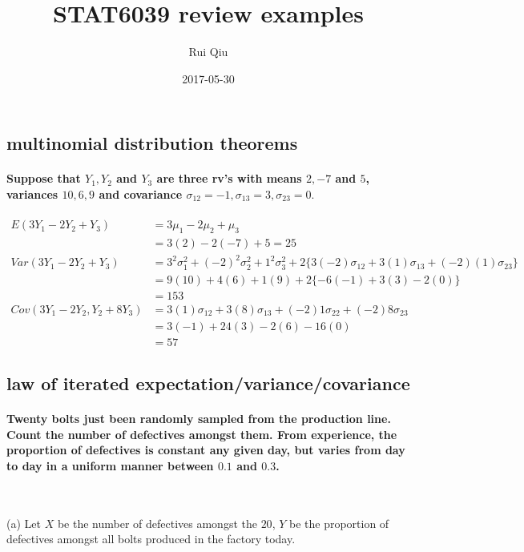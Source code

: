 \documentclass[a4paper, 11pt, twoside]{article}
\begin{document}
\title{STAT6039 review examples}
\author{Rui Qiu}
\date{2017-05-30}

\maketitle

\subsection{multinomial distribution theorems}

\paragraph{Suppose that $Y_1, Y_2$ and $Y_3$ are three rv's with means $2,-7$ and $5$, variances $10,6,9$ and covariance $\sigma_{12}=-1, \sigma_{13}=3, \sigma_{23}=0.$}

\[\begin{split}
E(3Y_1-2Y_2+Y_3)&=3\mu_1 -2\mu_2 +\mu_3\\
 &= 3(2)-2(-7)+5=25\\
 Var(3Y_1-2Y_2+Y_3)&=3^2\sigma_1^2+(-2)^2\sigma_2^2+1^2\sigma_3^2 + 2\{3(-2)\sigma_{12} + 3(1)\sigma_{13} + (-2)(1)\sigma_{23}\}\\
 &=9(10)+4(6)+1(9)+2\{-6(-1)+3(3)-2(0)\}\\
 &=153\\
 Cov(3Y_1-2Y_2, Y_2+8Y_3)&=3(1)\sigma_{12}+3(8)\sigma_{13}+(-2)1\sigma_{22}+(-2)8\sigma_{23}\\
 &= 3(-1)+24(3)-2(6)-16(0)\\
 &=57
\end{split}
\]

\subsection{law of iterated expectation/variance/covariance}

\paragraph{Twenty bolts just been randomly sampled from the production line. Count the number of defectives amongst them. From experience, the proportion of defectives is constant any given day, but varies from day to day in a uniform manner between $0.1$ and $0.3$.}\ 

(a) Let $X$ be the number of defectives amongst the $20$, $Y$ be the proportion of defectives amongst all bolts produced in the factory today.
\end{document}
